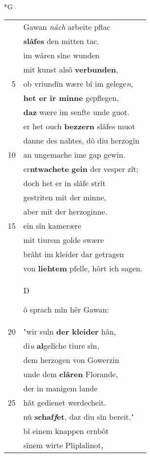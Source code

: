 \documentclass[8pt,a4paper,notitlepage]{article}
\begin{document}
\newpage
\begin{table}[ht]
\begin{minipage}[t]{0.5\linewidth}
\small
\begin{center}*G
\end{center}
\begin{tabular}{rl}
 & Gawan \textit{nâch} arbeite pflac\\ 
 & \textbf{slâfes} den mitten tac.\\ 
 & im wâren sîne wunden\\ 
 & mit kunst alsô \textbf{verbunden},\\ 
5 & ob vriundîn wære bî im gelege\textit{n},\\ 
 & \textbf{het er ir minne} gepflegen,\\ 
 & \textbf{daz} wære im senfte unde guot.\\ 
 & er het ouch \textbf{bezzern} slâfes muot\\ 
 & danne des nahtes, dô diu herzogîn\\ 
10 & an ungemache ime gap gewin.\\ 
 & er\textbf{ntwachete} \textbf{gein} der vesper zît;\\ 
 & doch het er in slâfe strît\\ 
 & gestriten mit der minne,\\ 
 & aber mit der herzoginne.\\ 
15 & ein sîn kamerære\\ 
 & mit tiurem golde swære\\ 
 & brâht im kleider dar getragen\\ 
 & von \textbf{liehtem} pfelle, hôrt ich sagen.\\ 
 & \begin{large}D\end{large}ô sprach mîn hêr Gawan:\\ 
20 & "wir suln \textbf{der kleider} hân,\\ 
 & di\textit{u} \textbf{al}gelîche tiure sîn,\\ 
 & dem herzogen von Gowerzin\\ 
 & unde dem \textbf{clâren} Florande,\\ 
 & der in manigem lande\\ 
25 & hât gedienet werdecheit.\\ 
 & nû \textbf{schaf\textit{f}et}, daz diu sîn bereit."\\ 
 & bî einem knappen ernbôt\\ 
 & sînem wirte Pliplalinot,\\ 

\end{tabular}
\end{minipage}
\end{table}
\end{document}

